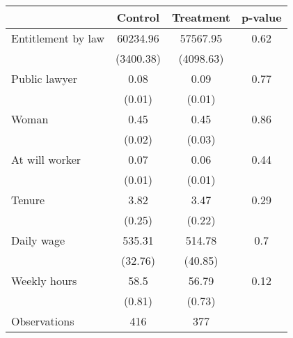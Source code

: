 \begin{tabular}{lccc}
\toprule
      & Control & Treatment & p-value \\
\midrule
\midrule
Entitlement by law & 60234.96 & 57567.95 & 0.62 \\
      & (3400.38) & (4098.63) &  \\
Public lawyer & 0.08  & 0.09  & 0.77 \\
      & (0.01) & (0.01) &  \\
Woman & 0.45  & 0.45  & 0.86 \\
      & (0.02) & (0.03) &  \\
At will worker & 0.07  & 0.06  & 0.44 \\
      & (0.01) & (0.01) &  \\
Tenure & 3.82  & 3.47  & 0.29 \\
      & (0.25) & (0.22) &  \\
Daily wage & 535.31 & 514.78 & 0.7 \\
      & (32.76) & (40.85) &  \\
Weekly hours & 58.5  & 56.79 & 0.12 \\
      & (0.81) & (0.73) &  \\
\midrule
Observations & 416   & 377   &  \\
\bottomrule
\bottomrule
\end{tabular}%
